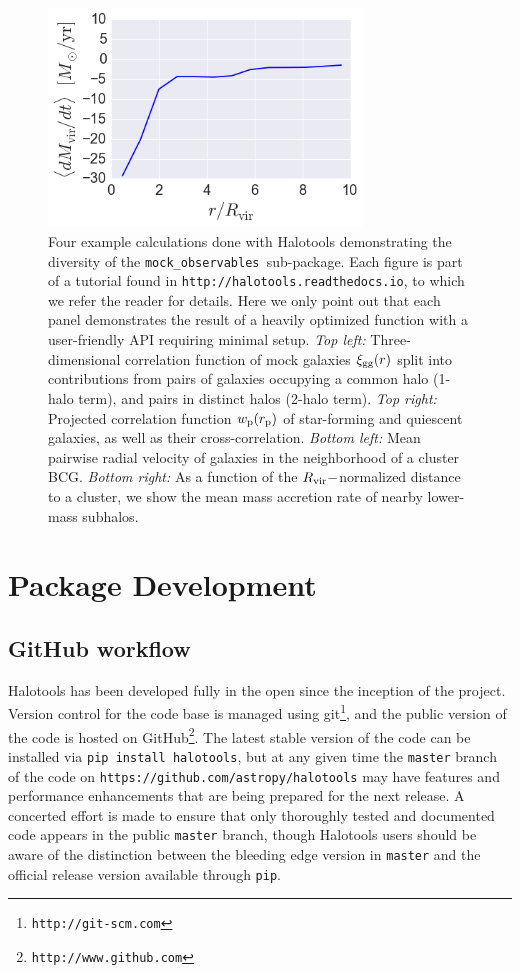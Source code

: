 \documentclass[twocolumn, tighten]{aastex6}
\newcommand{\rproj}{r_{\rm p}}
\newcommand{\mockobs}{{\tt mock\_observables }}
\begin{document}
\begin{figure}
\begin{center}
\includegraphics[width=8.3cm]{./FIGS/radial_profile_halocat_tutorial_fig1.png}
\caption{
Four example calculations done with Halotools demonstrating the diversity of the \mockobs sub-package. Each figure is part of a tutorial found in {\tt http://halotools.readthedocs.io}, to which we refer the reader for details. Here we only point out that each panel demonstrates the result of a heavily optimized function with a user-friendly API requiring minimal setup. {\em Top left:} Three-dimensional correlation function of mock galaxies $\xi_{\rm gg}(r)$ split into contributions from pairs of galaxies occupying a common halo (1-halo term), and pairs in distinct halos (2-halo term). {\em Top right:} Projected correlation function $w_{\rm p}(\rproj)$ of star-forming and quiescent galaxies, as well as their cross-correlation. {\em Bottom left:} Mean pairwise radial velocity of galaxies in the neighborhood of a cluster BCG. {\em Bottom right:} As a function of the $R_{\rm vir}-$normalized distance to a cluster, we show the mean mass accretion rate of nearby lower-mass subhalos. 
}
\label{fig:mockobs}
\end{center}
\end{figure}

\section{Package Development}
\label{section:development}

\subsection{GitHub workflow}
\label{subsection:githubworkflow}

Halotools has been developed fully in the open since the inception of the project. Version control for the code base is managed using git\footnote{\tt http://git-scm.com}, and the public version of the code is hosted on GitHub\footnote{\tt http://www.github.com}. The latest stable version of the code can be installed via {\tt pip install halotools}, but at any given time the {\tt master} branch of the code on {\tt https://github.com/astropy/halotools} may have features and performance enhancements that are being prepared for the next release. A concerted effort is made to ensure that only thoroughly tested and documented code appears in the public {\tt master} branch, though Halotools users should be aware of the distinction between the bleeding edge version in {\tt master} and the official release version available through {\tt pip}. 
\end{document}
